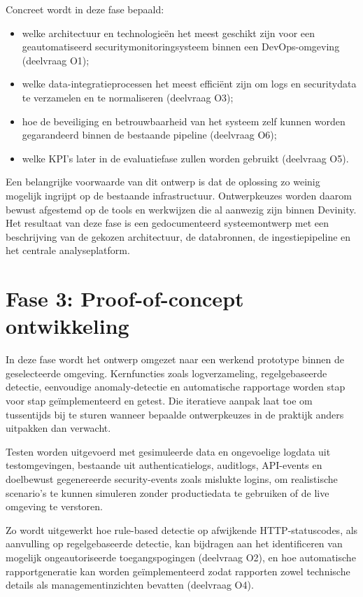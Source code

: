 Concreet wordt in deze fase bepaald:

\begin{itemize}
    \item welke architectuur en technologieën het meest geschikt zijn voor een geautomatiseerd securitymonitoringsysteem binnen een DevOps-omgeving (deelvraag O1);
    
    \item welke data-integratieprocessen het meest efficiënt zijn om logs en securitydata te verzamelen en te normaliseren (deelvraag O3);
    
    \item hoe de beveiliging en betrouwbaarheid van het systeem zelf kunnen worden gegarandeerd binnen de bestaande pipeline (deelvraag O6);
    
    \item welke KPI's later in de evaluatiefase zullen worden gebruikt (deelvraag O5).
\end{itemize}

Een belangrijke voorwaarde van dit ontwerp is dat de oplossing zo weinig mogelijk ingrijpt op de bestaande infrastructuur. Ontwerpkeuzes worden daarom bewust afgestemd op de tools en werkwijzen die al aanwezig zijn binnen Devinity. Het resultaat van deze fase is een gedocumenteerd systeemontwerp met een beschrijving van de gekozen architectuur, de databronnen, de ingestiepipeline en het centrale analyseplatform.

\section{Fase 3: Proof-of-concept ontwikkeling}
In deze fase wordt het ontwerp omgezet naar een werkend prototype binnen de geselecteerde omgeving. Kernfuncties zoals logverzameling, regelgebaseerde detectie, eenvoudige anomaly-detectie en automatische rapportage worden stap voor stap geïmplementeerd en getest. Die iteratieve aanpak laat toe om tussentijds bij te sturen wanneer bepaalde ontwerpkeuzes in de praktijk anders uitpakken dan verwacht.

Testen worden uitgevoerd met gesimuleerde data en ongevoelige logdata uit testomgevingen, bestaande uit authenticatielogs, auditlogs, API-events en doelbewust gegenereerde security-events zoals mislukte logins, om realistische scenario's te kunnen simuleren zonder productiedata te gebruiken of de live omgeving te verstoren.

Zo wordt uitgewerkt hoe rule-based detectie op afwijkende HTTP-statuscodes, als aanvulling op regelgebaseerde detectie, kan bijdragen aan het identificeren van mogelijk ongeautoriseerde toegangspogingen (deelvraag O2), en hoe automatische rapportgeneratie kan worden geïmplementeerd zodat rapporten zowel technische details als managementinzichten bevatten (deelvraag O4).

